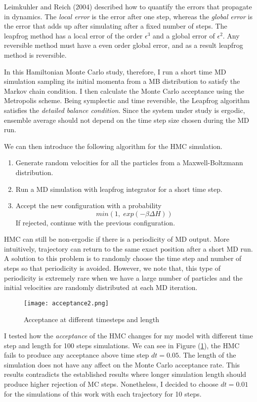 \documentclass[aps,prl,reprint]{revtex4-1}
\begin{document}
Leimkuhler and Reich (2004) described how to quantify the errors that propagate in dynamics. \cite{Leimkuhler2004} The \textit{local error} is the error after one step, whereas the \textit{global error} is the error that adds up after simulating after a fixed number of steps. The leapfrog method has a local error of the order $\epsilon ^ 3$ and a global error of $\epsilon ^ 2$. Any reversible method must have a even order global error, and as a result leapfrog method is reversible.

In this Hamiltonian Monte Carlo study, therefore, I run a short time MD simulation sampling its initial momenta from a MB distribution to satisfy the Markov chain condition. I then calculate the Monte Carlo acceptance using the Metropolis scheme. Being symplectic and time reversible, the Leapfrog algorithm satisfies the \textit{detailed balance condition}. Since the system under study is ergodic, ensemble average should not depend on the time step size chosen during the MD run. 

We can then introduce the following algorithm for the HMC simulation.
\begin{enumerate}
	\item Generate random velocities for all the particles from a Maxwell-Boltzmann distribution. 
	\item Run a MD simulation with leapfrog integrator for a short time step.
	\item Accept the new configuration with a probability $$min(1,\; exp(-\beta \Delta H))$$
	If rejected, continue with the previous configuration.
\end{enumerate}

HMC can still be non-ergodic if there is a periodicity of MD output. More intuitively, trajectory can return to the same exact position after a short MD run. A solution to this problem is to randomly choose the time step and number of steps so that periodicity is avoided. \cite{Mackenze1989} However, we note that, this type of periodicity is extremely rare when we have a large number of particles and the initial velocities are randomly distributed at each MD iteration.

\begin{figure}
	\texttt{[image: acceptance2.png]}
	\caption{Acceptance at different timesteps and length} \label{acpt}
\end{figure}

I tested how the \textit{acceptance} of the HMC changes for my model with different time step and length for 100 steps simulations. We can see in Figure (\ref{acpt}), the HMC fails to produce any acceptance above time step $dt = 0.05$. The length of the simulation does not have any affect on the Monte Carlo acceptance rate. This results contradicts the established results where longer simulation length should produce higher rejection of MC steps. \cite{Neal2012} Nonetheless, I decided to choose $dt = 0.01$ for the simulations of this work with each trajectory for 10 steps.
\end{document}
